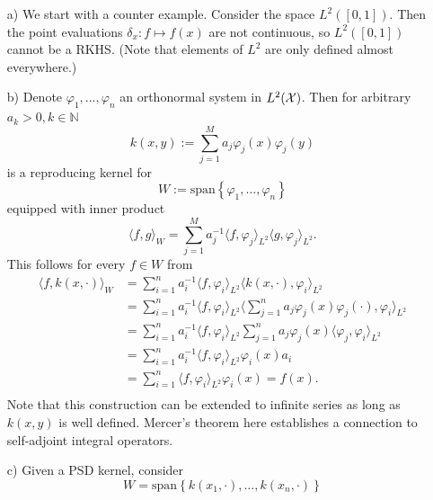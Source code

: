 \begin{example}[RKHS]
\begin{itemize}
	\item[a)] We start with a counter example. Consider the space $L^2([0, 1])$. Then the point evaluations $\delta_x: f \mapsto f(x)$ are not continuous, so $L^2([0, 1])$ cannot be a RKHS. (Note that elements of $L^2$ are only defined almost everywhere.)
	\item[b)] Denote $\varphi_1, \ldots, \varphi_n$ an orthonormal system in $L^2(\mathcal{X})$. Then for arbitrary $a_k > 0, k \in \mathbb{N}$
	\begin{equation}
		k(x, y) := \sum_{j=1}^M a_j \varphi_j(x)\varphi_j(y)
	\end{equation}
	is a reproducing kernel for 
	\begin{equation*}
		W := \mathrm{span}\left\{\varphi_1, \ldots, \varphi_n\right\}
	\end{equation*}
	equipped with inner product 
	\begin{equation*}
		\langle f, g \rangle_W = \sum_{j=1}^M a_j^{-1} \langle f, \varphi_j \rangle_{L^2} \langle g, \varphi_j \rangle_{L^2}.
	\end{equation*}
	This follows for every $f \in W$ from
	\begin{align*}
		\langle f, k(x, \cdot ) \rangle_W &= \sum_{i=1}^n a_i^{-1} \langle f, \varphi_i \rangle_{L^2} \langle k(x, \cdot ), \varphi_i \rangle_{L^2} \\
		& = \sum_{i=1}^n a_i^{-1} \langle f, \varphi_i \rangle_{L^2} \langle \sum_{j=1}^n a_j \varphi_j(x)\varphi_j(\cdot), \varphi_i \rangle_{L^2} \\
		& = \sum_{i=1}^n a_i^{-1} \langle f, \varphi_i \rangle_{L^2} \sum_{j=1}^n a_j \varphi_j(x)\langle \varphi_j, \varphi_i \rangle_{L^2} \\
		& = \sum_{i=1}^n a_i^{-1} \langle f, \varphi_i \rangle_{L^2} \varphi_i(x) a_i \\
		& = \sum_{i=1}^n \langle f, \varphi_i \rangle_{L^2} \varphi_i(x) = f(x). \\
	\end{align*}
	Note that this construction can be extended to infinite series as long as $k(x, y)$ is well defined. Mercer's theorem here establishes a connection to self-adjoint integral operators.
	\item[c)] Given a PSD kernel, consider 
	\begin{equation*}
			W = \mathrm{span}\left\{k(x_1, \cdot), \ldots, k(x_n, \cdot)\right\}
	\end{equation*}

\end{itemize}
\end{example}
